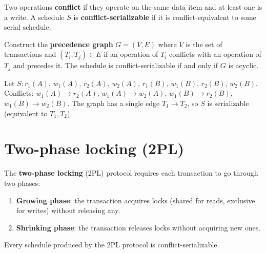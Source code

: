 \begin{definition}
Two operations \textbf{conflict} if they operate on the same data item and
at least one is a write. A schedule $S$ is \textbf{conflict-serializable}
if it is conflict-equivalent to some serial schedule.
\end{definition}

\begin{theorem}
Construct the \textbf{precedence graph} $G = (V, E)$ where $V$ is the set
of transactions and $(T_i, T_j) \in E$ if an operation of $T_i$ conflicts
with an operation of $T_j$ and precedes it. The schedule is conflict-serializable
if and only if $G$ is acyclic.
\end{theorem}

\begin{example}
Let $S : r_1(A),\, w_1(A),\, r_2(A),\, w_2(A),\, r_1(B),\, w_1(B),\, r_2(B),\, w_2(B)$.
Conflicts: $w_1(A) \to r_2(A)$, $w_1(A) \to w_2(A)$,
$w_1(B) \to r_2(B)$, $w_1(B) \to w_2(B)$. The graph has a single edge
$T_1 \to T_2$, so $S$ is serializable (equivalent to $T_1, T_2$).
\end{example}

\section{Two-phase locking (2PL)}

\begin{definition}[2PL protocol]
The \textbf{two-phase locking} (2PL) protocol requires each transaction
to go through two phases:
\begin{enumerate}
  \item \textbf{Growing phase}: the transaction acquires locks (shared for
        reads, exclusive for writes) without releasing any.
  \item \textbf{Shrinking phase}: the transaction releases locks without
        acquiring new ones.
\end{enumerate}
\end{definition}

\begin{theorem}[Correctness of 2PL]
Every schedule produced by the 2PL protocol is conflict-serializable.
\end{theorem}

